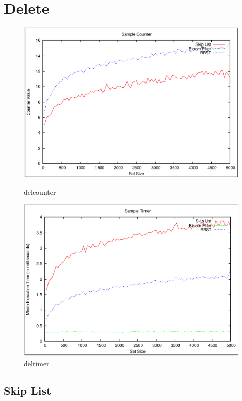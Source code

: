 \documentclass[11pt]{article}
\begin{document}
\section{Delete}
\begin{figure}[H]
\begin{minipage}{.5\linewidth}
\centering
\includegraphics[width=1\linewidth]{delcounter.png}
\caption{delcounter}
\end{minipage}
\hspace{0.5cm}
\begin{minipage}{.5\linewidth}
\centering
\includegraphics[width=1\linewidth]{deltimer.png}
\caption{deltimer}
\end{minipage}
\end{figure}
\subsection*{Skip List}
\end{document}

